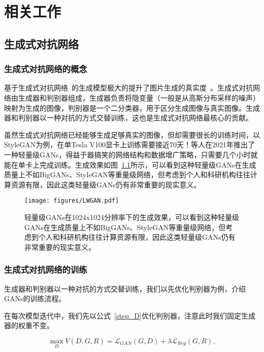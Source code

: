 \chapter{相关工作}

\section{生成式对抗网络}

\subsection{生成式对抗网络的概念}

基于生成式对抗网络~\cite{GANs}的生成模型极大的提升了图片生成的真实度~\cite{BigGANs,StyleGAN}。生成式对抗网络由生成器和判别器组成，生成器负责将隐变量（一般是从高斯分布采样的噪声）映射为生成的图像，判别器是一个二分类器，用于区分生成图像与真实图像。生成器和判别器以一种对抗的方式交替训练，这也是生成式对抗网络最核心的贡献。

虽然生成式对抗网络已经能够生成足够真实的图像，但却需要很长的训练时间，以StyleGAN为例，在单Tesla V100显卡上训练需要接近70天！等人在2021年推出了一种轻量级GANs，得益于器搞笑的网络结构和数据增广策略，只需要几个小时就能在单卡上完成训练。生成效果如图~\ref{LWGAN}所示，可以看到这种轻量级GANs在生成质量上不如BigGANs、StyleGAN等重量级网络，但考虑到个人和科研机构往往计算资源有限，因此这类轻量级GANs仍有非常重要的现实意义。

\begin{figure}
    \centering
    \texttt{[image: figures/LWGAN.pdf]}
    \caption{轻量级GANs在1024x1024分辨率下的生成效果，可以看到这种轻量级GANs在生成质量上不如BigGANs、StyleGAN等重量级网络，但考虑到个人和科研机构往往计算资源有限，因此这类轻量级GANs仍有非常重要的现实意义。}
    \label{LWGAN}
\end{figure}

\subsection{生成式对抗网络的训练}

生成器和判别器以一种对抗的方式交替训练，我们以先优化判别器为例，介绍GANs的训练流程。

在每次模型迭代中，我们先以公式~\ref{step_D}优化判别器，注意此时我们固定生成器的权重不变。

\begin{equation}
    \max _{D} V(D, G, R) = \mathcal{L}_{GAN}(G, D) + \lambda \mathcal{L}_{Reg}(G, R),
    \label{step_D}
\end{equation}

